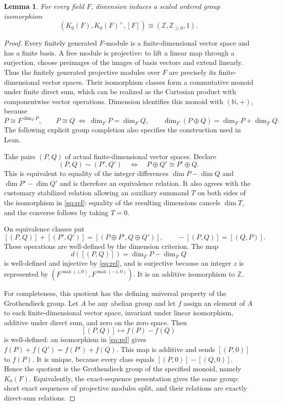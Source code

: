 \documentclass[11pt]{article}
\newtheorem{lemma}{Lemma}
\begin{document}
\begin{lemma}\label{lem:field}
For every field $F$, dimension induces a scaled ordered group isomorphism
\[
 (K_0(F),K_0(F)^+,[F])\cong(\mathbb Z,\mathbb Z_{\geq0},1).
\]
\end{lemma}
\begin{proof}
Every finitely generated $F$-module is a finite-dimensional vector space
and has a finite basis. A free module is projective: to lift a linear map
through a surjection, choose preimages of the images of basis vectors and
extend linearly. Thus the finitely generated projective modules over $F$
are precisely its finite-dimensional vector spaces. Their isomorphism
classes form a commutative monoid under finite direct sum, which can be
realized as the Cartesian product with componentwise vector operations.
Dimension identifies this monoid with $(\mathbb N,+)$, because
\[
 P\cong F^{\dim_F P},\qquad
 P\cong Q\ \Longleftrightarrow\ \dim_F P=\dim_F Q,
 \qquad \dim_F(P\oplus Q)=\dim_F P+\dim_F Q.
\]
The following explicit group completion also specifies the construction
used in Lean.

Take pairs $(P,Q)$ of actual finite-dimensional vector spaces. Declare
\begin{equation}\label{eq:rel}
 (P,Q)\sim(P',Q')
 \quad\Longleftrightarrow\quad
 P\oplus Q'\cong P'\oplus Q.
\end{equation}
This is equivalent to equality of the integer differences
$\dim P-\dim Q$ and $\dim P'-\dim Q'$ and is therefore an equivalence
relation. It also agrees with the customary stabilized relation allowing
an auxiliary summand $T$ on both sides of the isomorphism in
\eqref{eq:rel}: equality of the resulting dimensions cancels $\dim T$,
and the converse follows by taking $T=0$.

On equivalence classes put
\[
 [(P,Q)]+[(P',Q')]=[(P\oplus P',Q\oplus Q')],
 \qquad -[(P,Q)]=[(Q,P)].
\]
These operations are well-defined by the dimension criterion. The map
\[
 d([(P,Q)])=\dim_F P-\dim_F Q
\]
is well-defined and injective by \eqref{eq:rel}, and is surjective because
an integer $z$ is represented by $(F^{\max(z,0)},F^{\max(-z,0)})$.
It is an additive isomorphism to $\mathbb Z$.

For completeness, this quotient has the defining universal property of
the Grothendieck group. Let $A$ be any abelian group and let $f$ assign an
element of $A$ to each finite-dimensional vector space, invariant under
linear isomorphism, additive under direct sum, and zero on the zero space.
Then
\[
 [(P,Q)]\longmapsto f(P)-f(Q)
\]
is well-defined: an isomorphism in \eqref{eq:rel} gives
$f(P)+f(Q')=f(P')+f(Q)$. This map is additive and sends $[(P,0)]$ to
$f(P)$. It is unique, because every class equals
$[(P,0)]-[(Q,0)]$. Hence the quotient is the Grothendieck group of the
specified monoid, namely $K_0(F)$. Equivalently, the exact-sequence
presentation gives the same group: short exact sequences of projective
modules split, and their relations are exactly direct-sum relations.


\end{proof}
\end{document}
